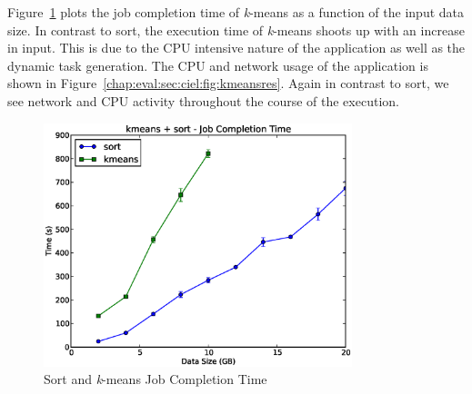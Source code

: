 \documentclass[a4paper,12pt,twoside,openright]{report}
\begin{document}
Figure~\ref{chap:eval:sec:ciel:fig:kmeans} plots the job completion time of
\emph{k}-means as a function of the input data size. In contrast to sort, the
execution time of \emph{k}-means shoots up with an increase in input. This is
due to the CPU intensive nature of the application as well as the dynamic task
generation. The CPU and network usage of the application is shown in
Figure~\ref{chap:eval:sec:ciel:fig:kmeansres}. Again in contrast to sort, we see
network and CPU activity throughout the course of the execution.

\begin{figure}[h!]
  \centering
    \includegraphics[width=0.8\textwidth]{kmeans_sort.eps}
    \caption{Sort and \emph{k}-means Job Completion Time}
    \label{chap:eval:sec:ciel:fig:kmeans}
\end{figure}
\end{document}
